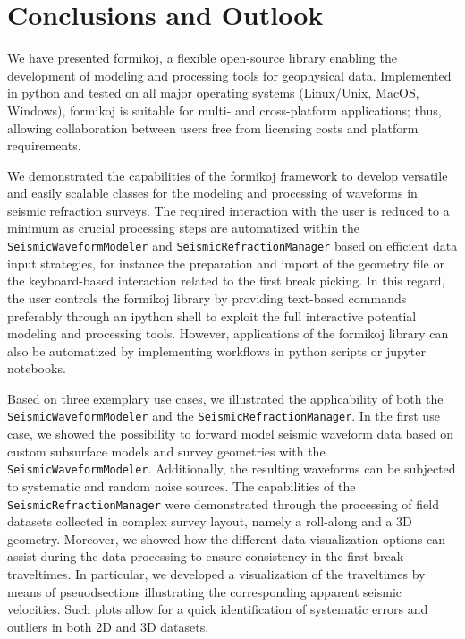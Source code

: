 \documentclass[a4paper,fleqn]{cas-sc}
\begin{document}
\section{Conclusions and Outlook}

We have presented formikoj, a flexible open-source library enabling the development of modeling and processing tools for geophysical data. Implemented in python and tested on all major operating systems (Linux/Unix, MacOS, Windows), formikoj is suitable for multi- and cross-platform applications; thus, allowing collaboration between users free from licensing costs and platform requirements.

We demonstrated the capabilities of the formikoj framework to develop versatile and easily scalable classes for the modeling and processing of waveforms in seismic refraction surveys. The required interaction with the user is reduced to a minimum as crucial processing steps are automatized within the \texttt{SeismicWaveformModeler} and \texttt{SeismicRefractionManager} based on efficient data input strategies, for instance the preparation and import of the geometry file or the keyboard-based interaction related to the first break picking. In this regard, the user controls the formikoj library by providing text-based commands preferably through an ipython shell to exploit the full interactive potential modeling and processing tools. However, applications of the formikoj library can also be automatized by implementing workflows in python scripts or jupyter notebooks.

Based on three exemplary use cases, we illustrated the applicability of both the \texttt{SeismicWaveformModeler} and the \texttt{SeismicRefractionManager}. In the first use case, we showed the possibility to forward model seismic waveform data based on custom subsurface models and survey geometries with the \texttt{SeismicWaveformModeler}. Additionally, the resulting waveforms can be subjected to systematic and random noise sources. 
The capabilities of the \texttt{SeismicRefractionManager} were demonstrated through the processing of field datasets collected in complex survey layout, namely a roll-along and a 3D geometry. 
Moreover, we showed how the different data visualization options can assist during the data processing to ensure consistency in the first break traveltimes. In particular, we developed a visualization of the traveltimes by means of pseuodsections illustrating the corresponding apparent seismic velocities. Such plots allow for a quick identification of systematic errors and outliers in both 2D and 3D datasets.
\end{document}
